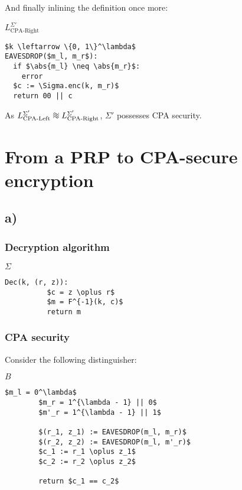 \documentclass[a4paper]{scrreprt}
\DeclarePairedDelimiter\abs{\lvert}{\rvert}
\newcommand*{\diffeo}{%
  \mathrel{\vcenter{\offinterlineskip
  \hbox{$\sim$}\vskip-.35ex\hbox{$\sim$}\vskip-.35ex\hbox{$\sim$}}}}
\begin{document}
And finally inlining the definition once more:
\begin{library}{$L^{\Sigma'}_{\text{CPA-Right}}$}
	\begin{lstlisting}[mathescape=true]
$k \leftarrow \{0, 1\}^\lambda$
EAVESDROP($m_l, m_r$):
  if $\abs{m_l} \neq \abs{m_r}$:
    error
  $c := \Sigma.enc(k, m_r)$
  return 00 || c
	\end{lstlisting}
\end{library}

As $L^{\Sigma'}_{\text{CPA-Left}} \diffeo L^{\Sigma'}_{\text{CPA-Right}}$,
$\Sigma'$ possesses CPA security.

\section{From a PRP to CPA-secure encryption}

\subsection{a)}

\subsubsection{Decryption algorithm}

\begin{library}{$\Sigma$}
	\begin{lstlisting}[mathescape=true,autogobble=true]
		Dec(k, (r, z)):
		  $c = z \oplus r$
		  $m = F^{-1}(k, c)$
		  return m
	\end{lstlisting}
\end{library}

\subsubsection{CPA security}

Consider the following distinguisher:
\begin{library}{$B$}
	\begin{lstlisting}[mathescape=true,autogobble=true]
		$m_l = 0^\lambda$
		$m_r = 1^{\lambda - 1} || 0$
		$m'_r = 1^{\lambda - 1} || 1$

		$(r_1, z_1) := EAVESDROP(m_l, m_r)$
		$(r_2, z_2) := EAVESDROP(m_l, m'_r)$
		$c_1 := r_1 \oplus z_1$
		$c_2 := r_2 \oplus z_2$

		return $c_1 == c_2$
	\end{lstlisting}
\end{library}
\end{document}
